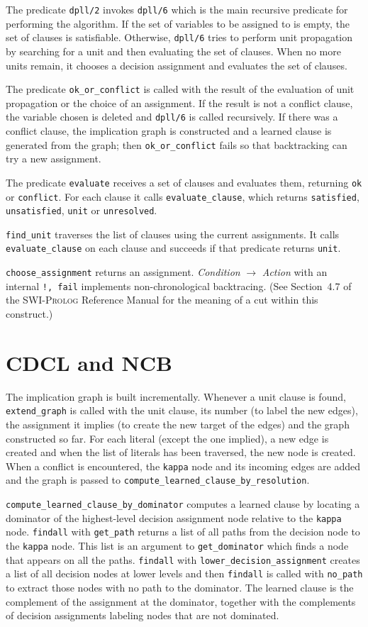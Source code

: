 \documentclass[11pt]{report}
\newcommand*{\p}[1]{\textup{\texttt{#1}}}
\newcommand*{\sw}{\textsc{SWI-Prolog}}
\begin{document}
The predicate \p{dpll/2} invokes \p{dpll/6} which is the main recursive
predicate for performing the algorithm. If the set of variables to be
assigned to is empty, the set of clauses is satisfiable. Otherwise,
\p{dpll/6} tries to perform unit propagation by searching for a unit and
then evaluating the set of clauses. When no more units remain, it
chooses a decision assignment and evaluates the set of clauses.

The predicate \p{ok\_or\_conflict} is called with the result of the
evaluation of unit propagation or the choice of an assignment. If the
result is not a conflict clause, the variable chosen is deleted and
\p{dpll/6} is called recursively. If there was a conflict clause, the
implication graph is constructed and a learned clause is generated from
the graph; then \p{ok\_or\_conflict} fails so that backtracking can try
a new assignment.

The predicate \p{evaluate} receives a set of clauses and evaluates them,
returning \p{ok} or \p{conflict}. For each clause it calls
\p{evaluate\_clause}, which returns \p{satisfied}, \p{unsatisfied},
\p{unit} or \p{unresolved}.

\p{find\_unit} traverses the list of clauses using the current
assignments. It calls \p{evaluate\_clause} on each clause and succeeds
if that predicate returns \p{unit}.

\p{choose\_assignment} returns an assignment. \emph{Condition}
$\rightarrow$ \emph{Action} with an internal \p{!, fail} implements
non-chronological backtracing. (See Section~4.7 of the \sw{} Reference
Manual for the meaning of a cut within this construct.)


\section{CDCL and NCB}

The implication graph is built incrementally. Whenever a unit clause is
found, \p{extend\_graph} is called with the unit clause, its number (to
label the new edges), the assignment it implies (to create the new
target of the edges) and the graph constructed so far. For each literal
(except the one implied), a new edge is created and when the list of
literals has been traversed, the new node is created. When a conflict is
encountered, the \p{kappa} node and its incoming edges are added and the
graph is passed to \p{compute\_learned\_clause\_by\_resolution}.

\p{compute\_learned\_clause\_by\_dominator} computes a learned clause by
locating a dominator of the highest-level decision assignment node
relative to the \p{kappa} node. \p{findall} with \p{get\_path} returns a
list of all paths from the decision node to the \p{kappa} node. This
list is an argument to \p{get\_dominator} which finds a node that
appears on all the paths. \p{findall} with
\p{lower\_decision\_assignment} creates a list of all decision nodes at
lower levels and then \p{findall} is called with \p{no\_path} to extract
those nodes with no path to the dominator. The learned clause is the
complement of the assignment at the dominator, together with the
complements of decision assignments labeling nodes that are not
dominated.
\end{document}
